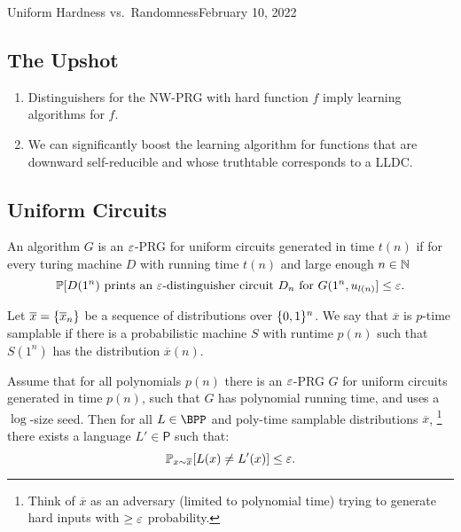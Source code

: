 \begin{lecture}{4}{Uniform Hardness vs.\ Randomness}{February 10, 2022}

\subsection*{The Upshot}

\begin{enumerate}
  \item Distinguishers for the NW-PRG with hard function $f$ imply learning
    algorithms for $f$.
  \item We can significantly boost the learning algorithm for functions that
    are downward self-reducible and whose truthtable corresponds to a LLDC.
\end{enumerate}


\subsection{Uniform Circuits}

\begin{definition}
	An algorithm $G$ is an $\varepsilon$-PRG for uniform circuits generated in time
	$t(n)$ if for every turing machine $D$ with running time $t(n)$ and
	large enough $n \in \mathbb{N}$
	\[
		\mathbb{P}[D(1^n) \text{ prints an } \varepsilon\text{-distinguisher circuit }
		D_n \text{ for } G(1^n, u_{l(n)}] \leq \varepsilon.
	\]
\end{definition}

\begin{definition}
	Let $\overline{x} = \{\overline{x}_n\}$ be a sequence of distributions
	over $\{0, 1\}^n$. We say that $\overline{x}$ is $p$-time samplable
	if there is a probabilistic machine $S$ with runtime $p(n)$ such that
	$S(1^n)$ has the distribution $\overline{x}(n)$.
\end{definition}

\begin{theorem}
	Assume that for all polynomials $p(n)$ there is an $\varepsilon$-PRG $G$ for
	uniform circuits generated in time $p(n)$, such that $G$ has polynomial
	running time, and uses a $\log$-size seed. Then for all
	$L \in \BPP$ and poly-time samplable distributions $\overline{x}$,%
	\footnote{Think of $\overline{x}$ as an adversary (limited to polynomial
	time) trying to generate hard inputs with $\geq \varepsilon$ probability.}
	there exists a language $L' \in \textsf{P}$ such that:
	\[
		\mathbb{P}_{x \sim \overline{x}}[L(x) \neq L'(x)] \leq \varepsilon.
	\]
\end{theorem}


\end{lecture}
